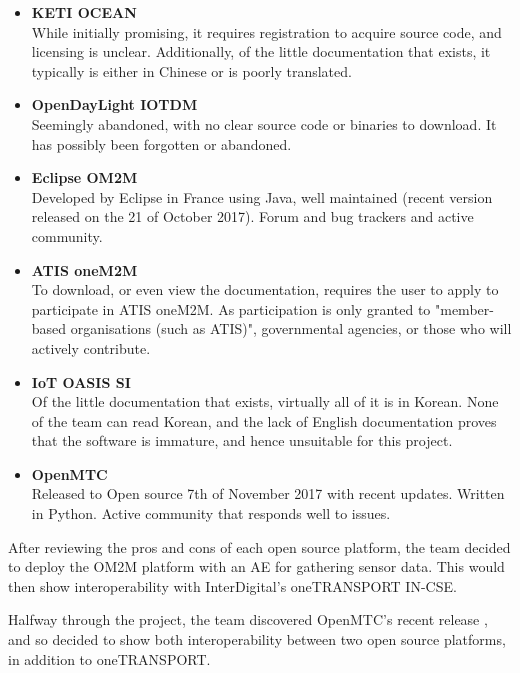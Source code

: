 \begin{itemize}
  \item \textbf{KETI OCEAN \cite{KETI2018OCEAN}}\\
  While initially promising, it requires registration to acquire source code, and licensing is unclear. Additionally, of the little documentation that exists, it typically is either in Chinese or is poorly translated.
  \item \textbf{OpenDayLight IOTDM \cite{OpenDayLightIoTDMProject}}\\
  Seemingly abandoned, with no clear source code or binaries to download. It has possibly been forgotten or abandoned.
  \item \textbf{Eclipse OM2M \cite{EclipseFoundation2015EclipseCommunication}}\\
  Developed by Eclipse in France using Java, well maintained (recent version released on the 21 of October 2017). Forum and bug trackers and active community. 
  \item \textbf{ATIS oneM2M}\\
  To download, or even view the documentation, requires the user to apply to participate in ATIS oneM2M. As participation is only granted to "member-based organisations (such as ATIS)", governmental agencies, or those who will actively contribute.
  \item \textbf{IoT OASIS SI \cite{iotoasis2017Iotoasis/SIIntegration}}\\
  Of the little documentation that exists, virtually all of it is in Korean. None of the team can read Korean, and the lack of English documentation proves that the software is immature, and hence unsuitable for this project.
  \item \textbf{OpenMTC \cite{OpenMTC2017OpenMTC}}\\
  Released to Open source 7th of November 2017 with recent updates. Written in Python. Active community that responds well to issues.
\end{itemize}

After reviewing the pros and cons of each open source platform, the team decided to deploy the OM2M platform with an AE for gathering sensor data. This would then show interoperability with InterDigital's oneTRANSPORT IN-CSE.

Halfway through the project, the team discovered OpenMTC's recent release \cite{OpenMTC2017OpenMTC}, and so decided to show both interoperability between two open source platforms, in addition to oneTRANSPORT.

